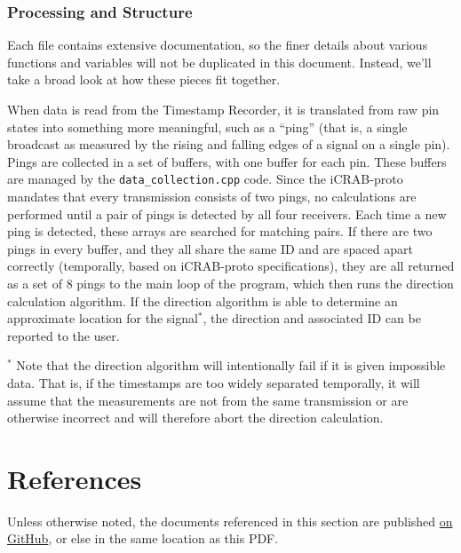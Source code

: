 \documentclass[12pt]{article}
\begin{document}
\subsubsection{Processing and Structure}\label{sec:proc-and-structure}

Each file contains extensive documentation, so the finer details about
various functions and variables will not be
duplicated in this document. Instead, we'll take a broad look at how these
pieces fit together.

When data is read from the Timestamp Recorder, it is translated from raw pin
states into something more meaningful, such as a ``ping'' (that is, a single
broadcast as measured by the rising and falling edges of a signal on a single
pin).
Pings are collected in a set of buffers, with one buffer for each pin.
These buffers are managed by the \texttt{data\_collection.cpp} code.
Since the \gls{iCRAB-proto} mandates that every transmission consists
of two pings, no calculations are performed until a pair of pings is detected
by all four receivers.
Each time a new ping is detected, these arrays are searched for matching pairs.
If there are two pings in every buffer, and they all share the same ID
and are spaced apart correctly (temporally, based on \gls{iCRAB-proto}
specifications), they are all returned as a set of 8 pings to the main loop of
the program, which then runs the direction calculation algorithm.
If the direction algorithm is able to determine an approximate location for
the signal$^*$, the direction and associated ID can be reported to the user.

\vfill
$^*$ Note that the direction algorithm will intentionally fail if it is given
impossible data.
That is, if the timestamps are too widely separated temporally, it will assume
that the measurements are not from the same transmission or are otherwise
incorrect and will therefore abort the direction calculation.

\newpage

\section{References} \label{references}

Unless otherwise noted, the documents referenced in this section are published
\href{https://github.com/cabeese/crab-tracker/tree/master/doc}{on GitHub},
or else in the same location as this PDF.
\end{document}
